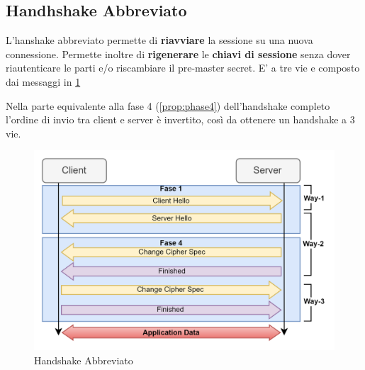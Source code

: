 \subsection{Handhshake Abbreviato}
L'hanshake abbreviato permette di \textbf{riavviare} la sessione su una nuova connessione. Permette inoltre di \textbf{rigenerare} le \textbf{chiavi di sessione} senza dover riautenticare le parti e/o riscambiare il pre-master secret. E' a tre vie e composto dai messaggi in \cref{fig:handshakeabbr}
\begin{remark}
Nella parte equivalente alla fase 4 (\cref{prop:phase4}) dell'handshake completo l'ordine di invio tra client e server è invertito, così da ottenere un handshake a 3 vie.
\end{remark}
\begin{figure}[H]
    \centering
    \includegraphics[width=\linewidth]{image/handshakeabbr.png}
    \caption{Handshake Abbreviato}
    \label{fig:handshakeabbr}
\end{figure}
